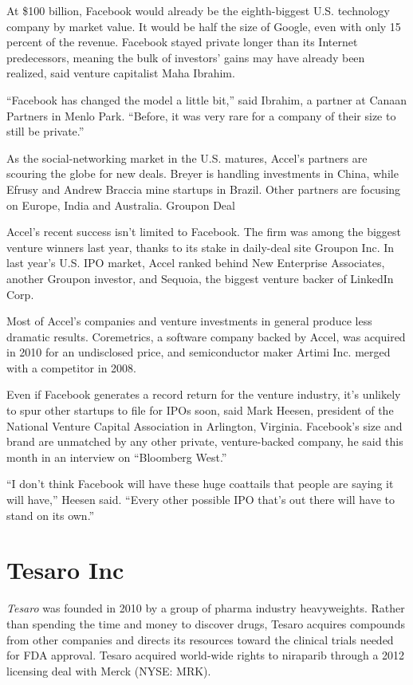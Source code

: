 \documentclass[letterpaper,12pt,english]{sphinxmanual}
\begin{document}
At \$100 billion, Facebook would already be the eighth-biggest U.S. technology company by market value. It would be half the size of Google, even with only 15 percent of the revenue. Facebook stayed private longer than its Internet predecessors, meaning the bulk of investors’ gains may have already been realized, said venture capitalist Maha Ibrahim.

“Facebook has changed the model a little bit,” said Ibrahim, a partner at Canaan Partners in Menlo Park. “Before, it was very rare for a company of their size to still be private.”

As the social-networking market in the U.S. matures, Accel’s partners are scouring the globe for new deals. Breyer is handling investments in China, while Efrusy and Andrew Braccia mine startups in Brazil. Other partners are focusing on Europe, India and Australia.
Groupon Deal

Accel’s recent success isn’t limited to Facebook. The firm was among the biggest venture winners last year, thanks to its stake in daily-deal site Groupon Inc. In last year’s U.S. IPO market, Accel ranked behind New Enterprise Associates, another Groupon investor, and Sequoia, the biggest venture backer of LinkedIn Corp.

Most of Accel’s companies and venture investments in general produce less dramatic results. Coremetrics, a software company backed by Accel, was acquired in 2010 for an undisclosed price, and semiconductor maker Artimi Inc. merged with a competitor in 2008.

Even if Facebook generates a record return for the venture industry, it’s unlikely to spur other startups to file for IPOs soon, said Mark Heesen, president of the National Venture Capital Association in Arlington, Virginia. Facebook’s size and brand are unmatched by any other private, venture-backed company, he said this month in an interview on “Bloomberg West.”

“I don’t think Facebook will have these huge coattails that people are saying it will have,” Heesen said. “Every other possible IPO that’s out there will have to stand on its own.”


\chapter{Tesaro Inc}
\label{chapters/chapter3:tesaro-inc}\label{chapters/chapter3:tesaro}\label{chapters/chapter3::doc}
\emph{Tesaro} was founded in 2010 by a group of pharma industry heavyweights. Rather than spending the time and money to discover drugs, Tesaro acquires compounds from other companies and directs its resources toward the clinical trials needed for FDA approval. Tesaro acquired world-wide rights to niraparib through a 2012 licensing deal with Merck (NYSE: MRK).
\end{document}
